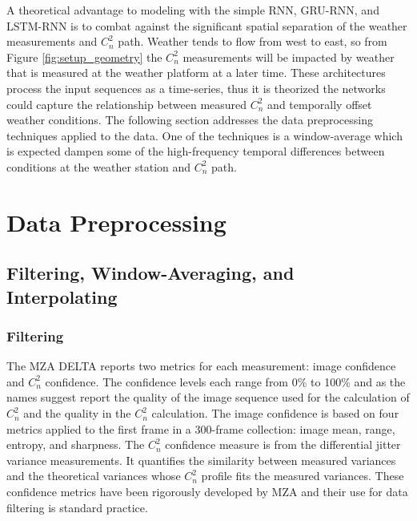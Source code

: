 A theoretical advantage to modeling with the simple \ac{RNN}, \ac{GRU-RNN}, and \ac{LSTM-RNN} is to combat against the significant spatial separation of the weather measurements and $C_{n}^{2}$ path. Weather tends to flow from west to east, so from Figure \ref{fig:setup_geometry} the $C_{n}^{2}$ measurements will be impacted by weather that is measured at the weather platform at a later time. These architectures process the input sequences as a time-series, thus it is theorized the networks could capture the relationship between measured $C_{n}^{2}$ and temporally offset weather conditions. The following section addresses the data preprocessing techniques applied to the data. One of the techniques is a window-average which is expected dampen some of the high-frequency temporal differences between conditions at the weather station and $C_{n}^{2}$ path.

\section{Data Preprocessing}
\subsection{Filtering, Window-Averaging, and Interpolating}
\label{sec:filt_winavg_interp}
\subsubsection{Filtering}
The MZA \ac{DELTA} reports two metrics for each measurement: image confidence and $C_{n}^{2}$ confidence. The confidence levels each range from 0\% to 100\% and as the names suggest report the quality of the image sequence used for the calculation of $C_{n}^{2}$ and the quality in the $C_{n}^{2}$ calculation. The image confidence is based on four metrics applied to the first frame in a 300-frame collection: image mean, range, entropy, and sharpness. The $C_{n}^{2}$ confidence measure is from the differential jitter variance measurements. It quantifies the similarity between measured variances and the theoretical variances whose $C_{n}^{2}$ profile fits the measured variances. These confidence metrics have been rigorously developed by MZA and their use for data filtering is standard practice.

